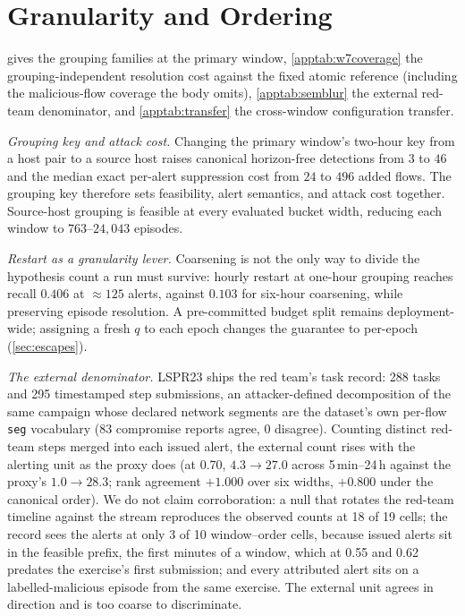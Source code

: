 \documentclass[conference]{IEEEtran}
\begin{document}
\section{Granularity and Ordering}\label{app:granularity}

 gives the grouping families at the primary window, \cref{apptab:w7coverage} the
grouping-independent resolution cost against the fixed atomic reference (including the malicious-flow
coverage the body omits), \cref{apptab:semblur} the external red-team denominator, and
\cref{apptab:transfer} the cross-window configuration transfer.

\emph{Grouping key and attack cost.} Changing the primary window's two-hour key from a host pair
to a source host raises canonical horizon-free detections from $3$ to $46$ and the median exact
per-alert suppression cost from $24$ to $496$ added flows. The grouping key therefore sets
feasibility, alert semantics, and attack cost together. Source-host grouping is feasible at every
evaluated bucket width, reducing each window to $763$--$24{,}043$ episodes.

\emph{Restart as a granularity lever.} Coarsening is not the only way to divide the hypothesis count a
run must survive: hourly restart at one-hour grouping reaches recall $0.406$ at $\approx125$ alerts,
against $0.103$ for six-hour coarsening, while preserving episode resolution. A pre-committed budget
split remains deployment-wide; assigning a fresh $q$ to each epoch changes the guarantee to per-epoch
(\cref{sec:escapes}).

\emph{The external denominator.} LSPR23 ships the red team's task record: 288 tasks and 295 timestamped
step submissions, an attacker-defined decomposition of the same campaign whose declared network segments
are the dataset's own per-flow \texttt{seg} vocabulary (83 compromise reports agree, 0 disagree).
Counting distinct red-team steps merged into each issued alert, the external count rises with the
alerting unit as the proxy does (at 0.70, $4.3\to27.0$ across 5\,min--24\,h against the proxy's
$1.0\to28.3$; rank agreement $+1.000$ over six widths, $+0.800$ under the canonical order). We do not
claim corroboration: a null that rotates the red-team timeline against the stream reproduces the observed
counts at 18 of 19 cells; the record sees the alerts at only 3 of 10 window--order cells, because issued
alerts sit in the feasible prefix, the first minutes of a window, which at 0.55 and 0.62 predates the
exercise's first submission; and every attributed alert sits on a labelled-malicious episode from the same
exercise. The external unit agrees in direction and is too coarse to discriminate.
\end{document}
